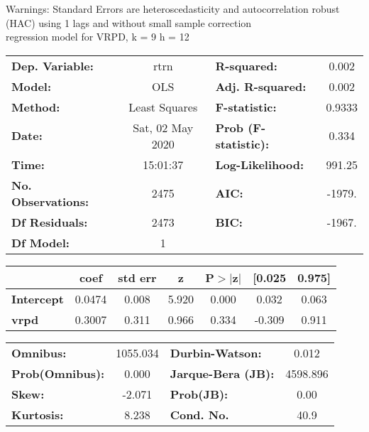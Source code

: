 Warnings: \newline
 [1] Standard Errors are heteroscedasticity and autocorrelation robust (HAC) using 1 lags and without small sample correction\\ 

regression model for VRPD, k = 9 h = 12\begin{center}
\begin{tabular}{lclc}
\toprule
\textbf{Dep. Variable:}    &       rtrn       & \textbf{  R-squared:         } &     0.002   \\
\textbf{Model:}            &       OLS        & \textbf{  Adj. R-squared:    } &     0.002   \\
\textbf{Method:}           &  Least Squares   & \textbf{  F-statistic:       } &    0.9333   \\
\textbf{Date:}             & Sat, 02 May 2020 & \textbf{  Prob (F-statistic):} &    0.334    \\
\textbf{Time:}             &     15:01:37     & \textbf{  Log-Likelihood:    } &    991.25   \\
\textbf{No. Observations:} &        2475      & \textbf{  AIC:               } &    -1979.   \\
\textbf{Df Residuals:}     &        2473      & \textbf{  BIC:               } &    -1967.   \\
\textbf{Df Model:}         &           1      & \textbf{                     } &             \\
\bottomrule
\end{tabular}
\begin{tabular}{lcccccc}
                   & \textbf{coef} & \textbf{std err} & \textbf{z} & \textbf{P$> |$z$|$} & \textbf{[0.025} & \textbf{0.975]}  \\
\midrule
\textbf{Intercept} &       0.0474  &        0.008     &     5.920  &         0.000        &        0.032    &        0.063     \\
\textbf{vrpd}      &       0.3007  &        0.311     &     0.966  &         0.334        &       -0.309    &        0.911     \\
\bottomrule
\end{tabular}
\begin{tabular}{lclc}
\textbf{Omnibus:}       & 1055.034 & \textbf{  Durbin-Watson:     } &    0.012  \\
\textbf{Prob(Omnibus):} &   0.000  & \textbf{  Jarque-Bera (JB):  } & 4598.896  \\
\textbf{Skew:}          &  -2.071  & \textbf{  Prob(JB):          } &     0.00  \\
\textbf{Kurtosis:}      &   8.238  & \textbf{  Cond. No.          } &     40.9  \\
\bottomrule
\end{tabular}
\end{center}

